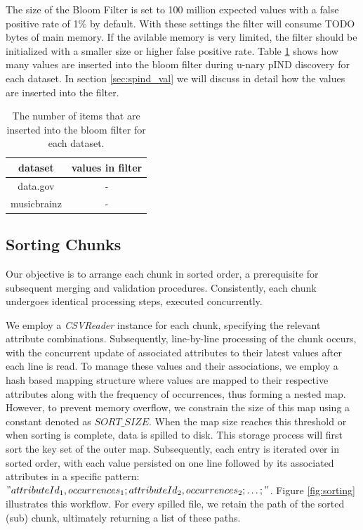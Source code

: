 The size of the Bloom Filter is set to 100 million expected values with a false positive rate of 1\% by default. With these settings the filter will consume TODO bytes of main memory. If the avilable memory is very limited, the filter should be initialized with a smaller size or higher false positive rate. Table \ref{tab:filter} shows how many values are inserted into the bloom filter during u-nary pIND discovery for each dataset. In section \ref{sec:spind_val} we will discuss in detail how the values are inserted into the filter.

\begin{table}
    \label{tab:filter}
    \begin{tabular}{c|c} 
     dataset & values in filter\\ 
     \hline\hline
     data.gov & - \\ 
     \hline
     musicbrainz & - \\
    \end{tabular}
    \caption{The number of items that are inserted into the bloom filter for each dataset.}
\end{table}


\subsection{Sorting Chunks}
Our objective is to arrange each chunk in sorted order, a prerequisite for subsequent merging and validation procedures. Consistently, each chunk undergoes identical processing steps, executed concurrently.

We employ a \textit{CSVReader} instance for each chunk, specifying the relevant attribute combinations. Subsequently, line-by-line processing of the chunk occurs, with the concurrent update of associated attributes to their latest values after each line is read. To manage these values and their associations, we employ a hash based mapping structure where values are mapped to their respective attributes along with the frequency of occurrences, thus forming a nested map. However, to prevent memory overflow, we constrain the size of this map using a constant denoted as $SORT\_SIZE$. When the map size reaches this threshold or when sorting is complete, data is spilled to disk. This storage process will first sort the key set of the outer map. Subsequently, each entry is iterated over in sorted order, with each value persisted on one line followed by its associated attributes in a specific pattern: $"attributeId_1,occurrences_1;attributeId_2,occurrences_2;\dots;"$. Figure \ref{fig:sorting} illustrates this workflow. For every spilled file, we retain the path of the sorted (sub) chunk, ultimately returning a list of these paths. \\

